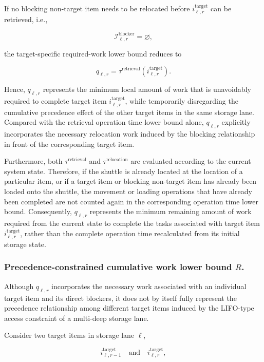 If no blocking non-target item needs to be relocated before
\(i^{\mathrm{target}}_{\ell,r}\) can be retrieved, i.e.,

\[
\mathcal{I}^{\mathrm{blocker}}_{\ell,r}
=
\varnothing,
\]

the target-specific required-work lower bound reduces to

\[
q_{\ell,r}
=
\tau^{\mathrm{retrieval}}
\left(
i^{\mathrm{target}}_{\ell,r}
\right).
\]

Hence, \(q_{\ell,r}\) represents the minimum local amount of work that is
unavoidably required to complete target item
\(i^{\mathrm{target}}_{\ell,r}\), while temporarily disregarding the
cumulative precedence effect of the other target items in the same storage
lane. Compared with the retrieval operation time lower bound alone,
\(q_{\ell,r}\) explicitly incorporates the necessary relocation work induced
by the blocking relationship in front of the corresponding target item.

Furthermore, both \(\tau^{\mathrm{retrieval}}\) and
\(\tau^{\mathrm{relocation}}\) are evaluated according to the current system
state. Therefore, if the shuttle is already located at the location of a
particular item, or if a target item or blocking non-target item has already
been loaded onto the shuttle, the movement or loading operations that have
already been completed are not counted again in the corresponding operation
time lower bound. Consequently, \(q_{\ell,r}\) represents the minimum
remaining amount of work required from the current state to complete the tasks
associated with target item \(i^{\mathrm{target}}_{\ell,r}\), rather than the
complete operation time recalculated from its initial storage state.

\subsubsection{Precedence-constrained cumulative work lower bound \(R\).}

Although \(q_{\ell,r}\) incorporates the necessary work associated with an
individual target item and its direct blockers, it does not by itself fully
represent the precedence relationship among different target items induced by
the LIFO-type access constraint of a multi-deep storage lane.

Consider two target items in storage lane \(\ell\),

\[
i^{\mathrm{target}}_{\ell,r-1}
\quad \text{and} \quad
i^{\mathrm{target}}_{\ell,r},
\]

